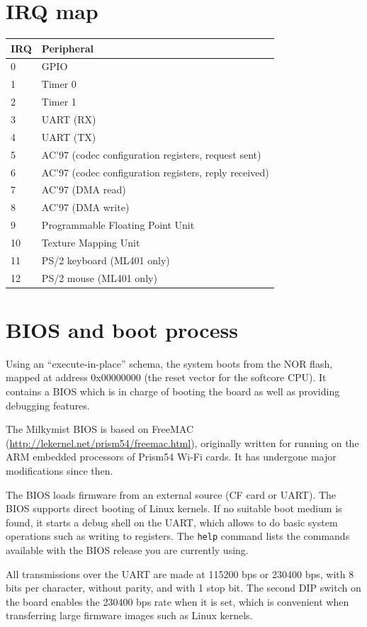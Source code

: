 \documentclass[a4paper,11pt]{article}
\begin{document}
\section{IRQ map}
\begin{tabularx}{\textwidth}{|l|X|}
\hline
\bf{IRQ} & \bf{Peripheral} \\
\hline
0 & GPIO \\
\hline
1 & Timer 0 \\
\hline
2 & Timer 1 \\
\hline
3 & UART (RX)\\
\hline
4 & UART (TX)\\
\hline
5 & AC'97 (codec configuration registers, request sent)\\
\hline
6 & AC'97 (codec configuration registers, reply received)\\
\hline
7 & AC'97 (DMA read)\\
\hline
8 & AC'97 (DMA write)\\
\hline
9 & Programmable Floating Point Unit\\
\hline
10 & Texture Mapping Unit\\
\hline
11 & PS/2 keyboard (ML401 only)\\
\hline
12 & PS/2 mouse (ML401 only)\\
\hline
\end{tabularx}

\section{BIOS and boot process}
Using an ``execute-in-place'' schema, the system boots from the NOR flash, mapped at address 0x00000000 (the reset vector for the softcore CPU). It contains a BIOS which is in charge of booting the board as well as providing debugging features.

The Milkymist BIOS is based on FreeMAC (\url{http://lekernel.net/prism54/freemac.html}), originally written for running on the ARM embedded processors of Prism54 Wi-Fi cards. It has undergone major modifications since then.

The BIOS loads firmware from an external source (CF card or UART). The BIOS supports direct booting of Linux kernels. If no suitable boot medium is found, it starts a debug shell on the UART, which allows to do basic system operations such as writing to registers. The \verb!help! command lists the commands available with the BIOS release you are currently using.

All transmissions over the UART are made at 115200 bps or 230400 bps, with 8 bits per character, without parity, and with 1 stop bit. The second DIP switch on the board enables the 230400 bps rate when it is set, which is convenient when transferring large firmware images such as Linux kernels.
\end{document}
